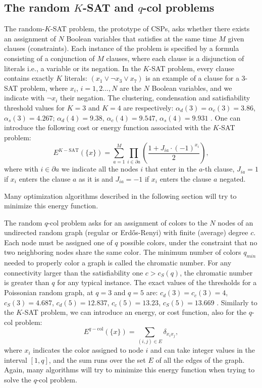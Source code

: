 \documentclass{article}
\begin{document}
\subsection{The random $K$-SAT and $q$-col problems}
\label{sec:Ksat_qcol}
The random-$K$-SAT problem, the prototype of CSPs, asks whether there exists an assignment of $N$ Boolean variables that satisfies at the same time $M$ given clauses (constraints). Each instance of the problem is specified by a formula consisting of a conjunction of $M$ clauses, where each clause is a disjunction of literals i.e., a variable or its negation. In the $K$-SAT problem, every clause contains exactly $K$ literals:  $(x_1\lor  \neg x_3\lor x_7)$ is an example of a clause for a 3-SAT problem, where $x_i$, $i=1,2...,N$ are the $N$ Boolean variables, and we indicate with $\neg x_i$ their negation. The clustering, condensation and satisfiability threshold values for $K=3$ and $K=4$ are respectively: $\alpha_d(3)=\alpha_c(3)=3.86$, $\alpha_s(3)=4.267$; $\alpha_d(4)=9.38$, $\alpha_c(4)=9.547$, $\alpha_s(4)=9.931$ \cite{Montanari_2008,MertensKSAT2006}. 
One can introduce the following cost or energy function associated with the $K$-SAT problem: 
\begin{equation}
E^{K-\text{SAT}}(\{x\})=\sum_{a=1}^{M}\prod_{i\in\partial a}\left(\frac{1+J_{ia}\cdot(-1)^{x_{i}}}{2}\right),
\label{eq:E_K-SAT}
\end{equation}
where with $i\in\partial a$ we indicate all the nodes $i$ that enter in the $a$-th clause, $J_{ia}=1$ if $x_{i}$ enters the clause $a$ as it is and
$J_{ia}=-1$ if $x_{i}$ enters the clause $a$ negated.

Many optimization algorithms described in the following section will try to minimize this energy function.

The random $q$-col problem asks for an assignment of colors to the $N$ nodes of an undirected random graph (regular or Erd\H{o}s-Renyi) with finite (average) degree $c$. Each node must be assigned one of $q$ possible colors, under the constraint that no two neighboring nodes share the same color.
The minimum number of colors $q_{min}$ needed to properly color a graph is called the chromatic number. For any connectivity larger than the satisfiability one $c>c_S(q)$, the chromatic number is greater than $q$ for any typical instance. The exact values of the thresholds for a Poissonian random graph, at $q=3$ and $q=5$ are: $c_d(3)=c_c(3)=4$, $c_S(3)=4.687$, $c_d(5)=12.837$, $c_c(5)=13.23$, $c_S(5)=13.669$ \cite{zdeborova2007phase}. 
Similarly to the $K$-SAT problem, we can introduce an energy, or cost function, also for the $q$-col problem:
\begin{equation}
    E^{q-\text{col}}(\{x\}) = \sum_{(i,j)\in E} \delta_{x_i x_j},
\label{eq:E_qcol}
\end{equation}
where $x_i$ indicates the color assigned to node $i$ and can take integer values in the interval $[1,q]$, and the sum runs over the set $E$ of all the edges of the graph.
Again, many algorithms will try to minimize this energy function when trying to solve the $q$-col problem. 
\end{document}
